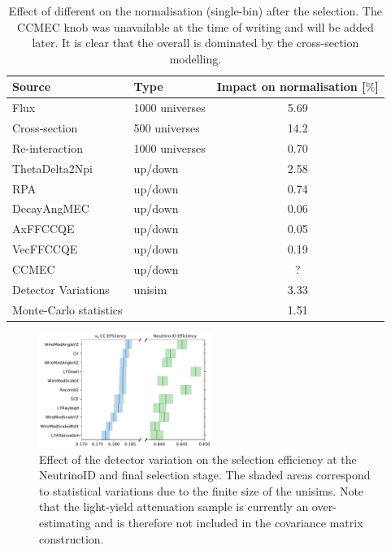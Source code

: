 \begin{table}[htb]
    \centering
    \begin{tabular}{llc}
\hline
Source                 & Type           & Impact on normalisation [$\%$] \\ \hline
Flux                   & 1000 universes & 5.69                           \\
Cross-section          & 500 universes  & 14.2                \\
Re-interaction         & 1000 universes & 0.70                           \\
ThetaDelta2Npi         & up/down        & 2.58                           \\
RPA                    & up/down        & 0.74                           \\
DecayAngMEC            & up/down        & 0.06                           \\
AxFFCCQE               & up/down        & 0.05                           \\
VecFFCCQE              & up/down        & 0.19                           \\
CCMEC                  & up/down        & ?                              \\
Detector Variations    & unisim         & 3.33                           \\
Monte-Carlo statistics &                & 1.51                           \\ \hline
\end{tabular}
    \caption{Effect of different \systs on the normalisation (single-bin) after the \nuecc selection. The CCMEC knob was unavailable at the time of writing and will be added later. It is clear that the overall \syst is dominated by the cross-section modelling.}
    \label{tab:nuecc:syst}
\end{table}

\begin{figure}
    \centering
    \includegraphics[width=0.5\textwidth]{NueCCsel/Images/syst/efficiency.pdf}
    \caption{Effect of the detector variation on the selection efficiency at the NeutrinoID and final selection stage. The shaded areas correspond to statistical variations due to the finite size of the unisims. Note that the light-yield attenuation sample is currently an over-estimating and is therefore not included in the covariance matrix construction.}
    \label{fig:nuecc:detvar_eff}
\end{figure}

